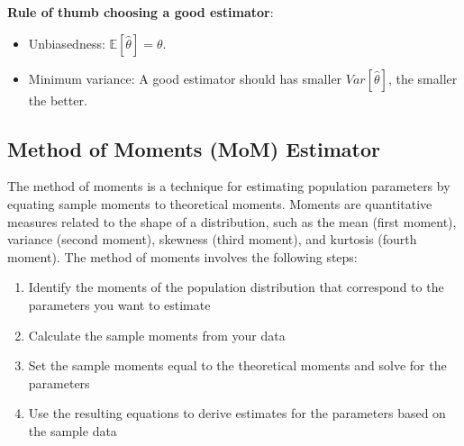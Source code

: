 \textbf{Rule of thumb choosing a good estimator}:
\begin{itemize}
    \item Unbiasedness: $\mathbb{E}[\hat{\theta}] = \theta$.
    \item Minimum variance: A good estimator should has smaller $Var[\hat{\theta}]$, the smaller the better.
\end{itemize}

\subsection{Method of Moments (MoM) Estimator}

The method of moments is a technique for estimating population parameters by equating sample moments to theoretical moments. Moments are quantitative measures related to the shape of a distribution, such as the mean (first moment), variance (second moment), skewness (third moment), and kurtosis (fourth moment).
The method of moments involves the following steps:
\begin{enumerate}
    \item Identify the moments of the population distribution that correspond to the parameters you want to estimate
    \item Calculate the sample moments from your data
    \item Set the sample moments equal to the theoretical moments and solve for the parameters
    \item   Use the resulting equations to derive estimates for the parameters based on the sample data
\end{enumerate}


